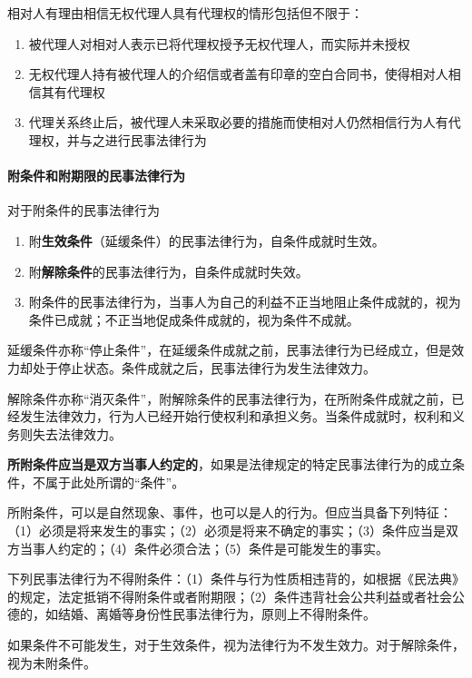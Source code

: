 \documentclass[UTF8,12pt]{ctexart}
\numberwithin{equation}{section} %
\numberwithin{figure}{section}
\numberwithin{table}{section}
\begin{document}
	相对人有理由相信无权代理人具有代理权的情形包括但不限于：
	\begin{enumerate}
		\item 被代理人对相对人表示已将代理权授予无权代理人，而实际并未授权
		
		\item 无权代理人持有被代理人的介绍信或者盖有印章的空白合同书，使得相对人相信其有代理权
		
		\item 代理关系终止后，被代理人未采取必要的措施而使相对人仍然相信行为人有代理权，并与之进行民事法律行为
	\end{enumerate}
	
	\paragraph{附条件和附期限的民事法律行为}
	对于附条件的民事法律行为
	\begin{enumerate}
		\item 附\textbf{生效条件}（延缓条件）的民事法律行为，自条件成就时生效。
		
		\item 附\textbf{解除条件}的民事法律行为，自条件成就时失效。
		
		\item 附条件的民事法律行为，当事人为自己的利益不正当地阻止条件成就的，视为条件已成就；不正当地促成条件成就的，视为条件不成就。
	\end{enumerate}
	
	延缓条件亦称“停止条件”，在延缓条件成就之前，民事法律行为已经成立，但是效力却处于停止状态。条件成就之后，民事法律行为发生法律效力。
	
	解除条件亦称“消灭条件”，附解除条件的民事法律行为，在所附条件成就之前，已经发生法律效力，行为人已经开始行使权利和承担义务。当条件成就时，权利和义务则失去法律效力。
	
	\textbf{所附条件应当是双方当事人约定的}，如果是法律规定的特定民事法律行为的成立条件，不属于此处所谓的“条件”。
	
	所附条件，可以是自然现象、事件，也可以是人的行为。但应当具备下列特征：（1）必须是将来发生的事实；（2）必须是将来不确定的事实；（3）条件应当是双方当事人约定的；（4）条件必须合法；（5）条件是可能发生的事实。
	
	下列民事法律行为不得附条件：（1）条件与行为性质相违背的，如根据《民法典》的规定，法定抵销不得附条件或者附期限；（2）条件违背社会公共利益或者社会公德的，如结婚、离婚等身份性民事法律行为，原则上不得附条件。
	
	如果条件不可能发生，对于生效条件，视为法律行为不发生效力。对于解除条件，视为未附条件。
	
\end{document}

